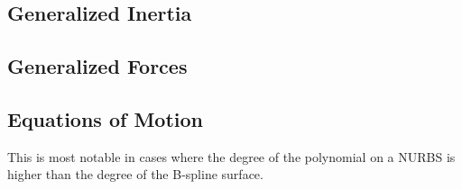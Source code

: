 \subsection{Generalized Inertia}
\subsection{Generalized Forces}
\subsection{Equations of Motion}
This is most notable in cases where the degree of the polynomial on a NURBS is higher than the degree of the B-spline surface.

%
%
%
%
%
%
